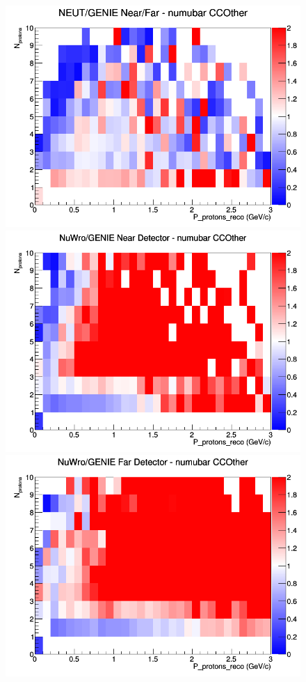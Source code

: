 \documentclass[12pt]{article}
\begin{document}
\begin{figure}[h]
\endminipage
{}
\includegraphics[width=\linewidth]{eff_N_P/GAr/protons/ratios/CCOther_NEUT_GENIE_numubar_NF_N_P.png}
\endminipage
\newline
{}
\includegraphics[width=\linewidth]{eff_N_P/GAr/protons/ratios/CCOther_NuWro_GENIE_numubar_near_N_P.png}
\endminipage
{}
\includegraphics[width=\linewidth]{eff_N_P/GAr/protons/ratios/CCOther_NuWro_GENIE_numubar_far_N_P.png}

\end{figure}
\end{document}
